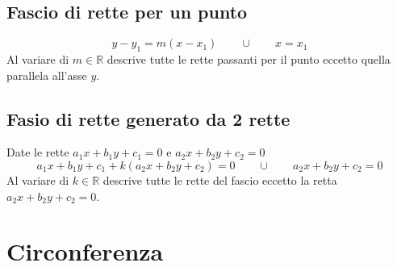 \documentclass{article}
\begin{document}
  \subsection*{Fascio di rette per un punto}
  \begin{equation}
    y-y_1 = m(x-x_1) \qquad\cup\qquad x = x_1
  \end{equation}
  Al variare di $m \in \mathbb{R}$ descrive tutte le rette passanti per il punto eccetto quella parallela all'asse $y$.

  \subsection*{Fasio di rette generato da 2 rette}
  Date le rette $a_1x+b_1y+c_1 = 0$ e $a_2x+b_2y+c_2 = 0$
  \begin{equation}
    a_1x+b_1y+c_1 + k (a_2x+b_2y+c_2) = 0 \qquad\cup\qquad a_2x+b_2y+c_2 = 0
  \end{equation}
  Al variare di $k \in \mathbb{R}$ descrive tutte le rette del fascio eccetto la retta $a_2x+b_2y+c_2 = 0$.

  \newpage
  \section{Circonferenza}
\end{document}
